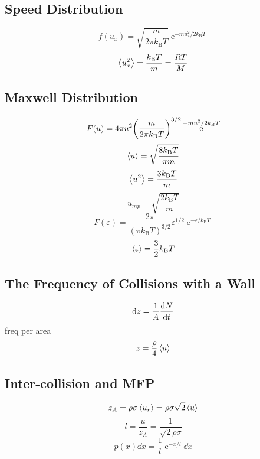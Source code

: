 \documentclass[a4paper]{article}
\DeclareMathOperator{\e}{\mathrm{e}}
\newcommand{\kB}{k_\mathrm{B}}
\numberwithin{equation}{section}
\begin{document}
\subsection{}
\subsection{Speed Distribution}
\begin{equation}\label{key}
f(u_x) = \sqrt{\dfrac{m}{2\pi\kB T}}\e^{-m u_x^2/2\kB T}
\end{equation}
\begin{equation}\label{key}
\ev{u_x^2} = \dfrac{\kB T}{m} = \dfrac{R T}{M}
\end{equation}

\subsection{Maxwell Distribution}
\begin{equation}\label{key}
F(u) = 4\pi u^2 \qty(\dfrac{m}{2\pi\kB T})^{3/2}\e^{-m u^2/2\kB T}
\end{equation}
\begin{equation}\label{key}
\ev{u} = \sqrt{\dfrac{8\kB T}{\pi m}}
\end{equation}
\begin{equation}\label{key}
\ev{u^2} = \dfrac{3\kB T}{m}
\end{equation}
\begin{equation}\label{key}
u_{mp} = \sqrt{\dfrac{2\kB T}{m}}
\end{equation}
\begin{equation}\label{key}
F(\varepsilon) = \dfrac{2\pi}{(\pi \kB T)^{3/2}}\varepsilon^{1/2}\e^{-\varepsilon/\kB T}
\end{equation}
\begin{equation}\label{key}
\ev{\varepsilon} = \dfrac{3}{2}\kB T
\end{equation}

\subsection{The Frequency of Collisions with a Wall}
\begin{equation}\label{key}
\dd z = \dfrac{1}{A}\dv{N}{t}
\end{equation}
freq per area
\begin{equation}\label{key}
z = \dfrac{\rho}{4}\ev{u}
\end{equation}

\subsection{Inter-collision and MFP}
\begin{equation}\label{key}
z_A  = \rho \sigma \ev{u_r} = \rho\sigma \sqrt{2}\ev{u}
\end{equation}
\begin{equation}\label{key}
l = \dfrac{u}{z_A} = \dfrac{1}{\sqrt{2}\rho\sigma}
\end{equation}
\begin{equation}\label{key}
p(x)\dd x = \dfrac{1}{l}\e^{-x/l}\dd x
\end{equation}
\end{document}
